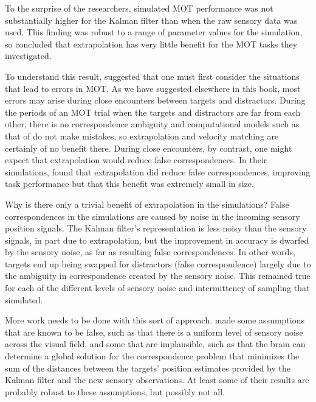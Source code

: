 \documentclass[
]{book}
\begin{document}
To the surprise of the researchers, simulated MOT performance was not substantially higher for the Kalman filter than when the raw sensory data was used. This finding was robust to a range of parameter values for the simulation, so \citet{zhongWhyPeopleAppear2014} concluded that extrapolation has very little benefit for the MOT tasks they investigated.

To understand this result, \citet{zhongWhyPeopleAppear2014} suggested that one must first consider the situations that lead to errors in MOT. As we have suggested elsewhere in this book, most errors may arise during close encounters between targets and distractors. During the periods of an MOT trial when the targets and distractors are far from each other, there is no correspondence ambiguity and computational models such as that of \citet{zhongWhyPeopleAppear2014} do not make mistakes, so extrapolation and velocity matching are certainly of no benefit there. During close encounters, by contrast, one might expect that extrapolation would reduce false correspondences. In their simulations, \citet{zhongWhyPeopleAppear2014} found that extrapolation did reduce false correspondences, improving task performance but that this benefit was extremely small in size.

Why is there only a trivial benefit of extrapolation in the \citet{zhongWhyPeopleAppear2014} simulations? False correspondences in the simulations are caused by noise in the incoming sensory position signals. The Kalman filter's representation is less noisy than the sensory signals, in part due to extrapolation, but the improvement in accuracy is dwarfed by the sensory noise, as far as resulting false correspondences. In other words, targets end up being swapped for distractors (false correspondence) largely due to the ambiguity in correspondence created by the sensory noise. This remained true for each of the different levels of sensory noise and intermittency of sampling that \citet{zhongWhyPeopleAppear2014} simulated.

More work needs to be done with this sort of approach. \citet{zhongWhyPeopleAppear2014} made some assumptions that are known to be false, such as that there is a uniform level of sensory noise across the visual field, and some that are implausible, such as that the brain can determine a global solution for the correspondence problem that minimizes the sum of the distances between the targets' position estimates provided by the Kalman filter and the new sensory observations. At least some of their results are probably robust to these assumptions, but possibly not all.
\end{document}
